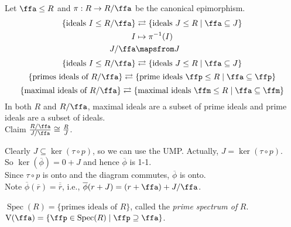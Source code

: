 \begin{fact}
    Let $\ffa \leq R$ and $\pi: R \to R/\ffa$ be the canonical epimorphism. 
    \begin{align*}
        \{\text{ideals }I \leq R/\ffa\} &\rightleftarrows \{\text{ideals }J \leq R \mid \ffa \subseteq J\} \\
        I &\mapsto \pi^{-1}(I) \\
        J/\ffa &\mapsfrom J
    \end{align*}
    \[ \{\text{ideals } I \leq R/\ffa\} \rightleftarrows \{\text{ideals }J \leq R \mid \ffa \subseteq J\} \]
    \[ \{\text{primes ideals of } R/\ffa\} \rightleftarrows \{\text{prime ideals }\ffp \leq R \mid \ffa \subseteq \ffp\} \]
    \[ \{\text{maximal ideals of } R/\ffa\} \rightleftarrows \{\text{maximal ideals }\ffm \leq R \mid \ffa \subseteq \ffm\} \]
    In both $R$ and $R/\ffa$, maximal ideals are a subset of prime ideals and prime ideals are a subset of ideals. \\
    Claim $\frac{R/\ffa}{J/\ffa} \cong \frac{R}{J}$.
    \begin{center}
    \end{center}
    Clearly $J \subseteq \ker(\tau \circ p)$, so we can use the UMP. Actually, $J = \ker(\tau \circ p)$. \\
    So $\ker(\overline \phi) = 0+J$ and hence $\overline \phi$ is 1-1. \\
    Since $\tau \circ p$ is onto and the diagram commutes, $\overline \phi$ is onto. \\
    Note $\overline \phi(\overline r) = \overline {\overline r}$, i.e., $\overline \phi(r + J) = (r+\ffa) + J/\ffa$.
\end{fact}

\begin{notation*}
    $\operatorname{Spec}(R) = \{\text{primes ideals of $R$}\}$, called the \emph{prime spectrum of} $R$. \\
    $\operatorname{V}(\ffa) = \{\ffp \in \operatorname{Spec}(R) \mid \ffp \supseteq \ffa\}$.
\end{notation*}

